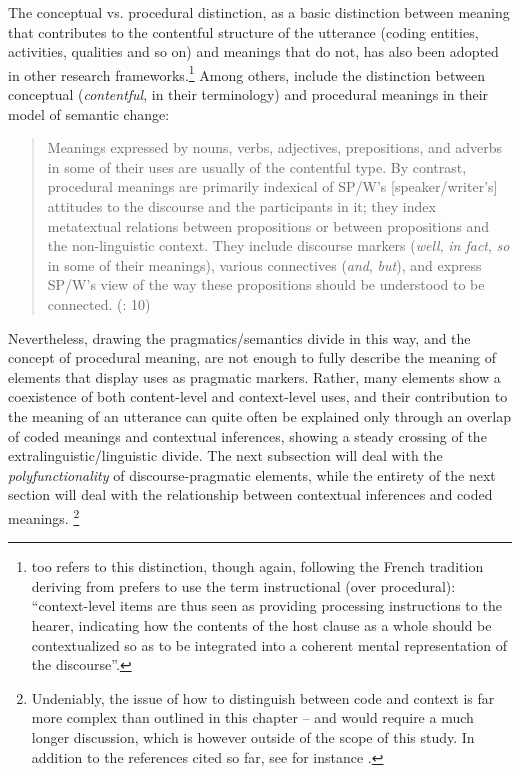 The conceptual vs. procedural distinction, as a basic distinction between meaning that contributes to the contentful structure of the utterance (coding entities, activities, qualities and so on) and meanings that do not, has also been adopted in other research frameworks.\footnote{\citet[594]{Hansen2012} too refers to this distinction, though again, following the French tradition deriving from \citet{DucrotEtAl1980} prefers to use the term instructional (over procedural): “context-level items are thus seen as providing processing instructions to the hearer, indicating how the contents of the host clause as a whole should be contextualized so as to be integrated into a coherent mental representation of the discourse”.}  Among others, \citet{TraugottDasher2002} include the distinction between conceptual (\textit{contentful}, in their terminology) and procedural meanings in their model of semantic change:

\begin{quote}
Meanings expressed by nouns, verbs, adjectives, prepositions, and adverbs in some of their uses are usually of the contentful type. By contrast, procedural meanings are primarily indexical of SP/W’s [speaker/writer’s] attitudes to the discourse and the participants in it; they index metatextual relations between propositions or between propositions and the non-linguistic context. They include discourse markers (\textit{well}, \textit{in fact}, \textit{so} in some of their meanings), various connectives (\textit{and}, \textit{but}), and express SP/W’s view of the way these propositions should be understood to be connected. (\citealt{TraugottDasher2002}: 10)
\end{quote}

Nevertheless, drawing the pragmatics/semantics divide in this way, and the concept of procedural meaning, are not enough to fully describe the meaning of elements that display uses as pragmatic markers. Rather, many elements show a coexistence of both content-level and context-level uses, and their contribution to the meaning of an utterance can quite often be explained only through an overlap of coded meanings and contextual inferences, showing a steady crossing of the extralinguistic/linguistic divide. The next subsection will deal with the \textit{polyfunctionality} of discourse-pragmatic elements, while the entirety of the next section will deal with the relationship between contextual inferences and coded meanings.\textsuperscript{} \footnote{Undeniably, the issue of how to distinguish between code and context is far more complex than outlined in this chapter – and would require a much longer discussion, which is however outside of the scope of this study. In addition to the references cited so far, see for instance \citet{BellighWillems2021}.}

